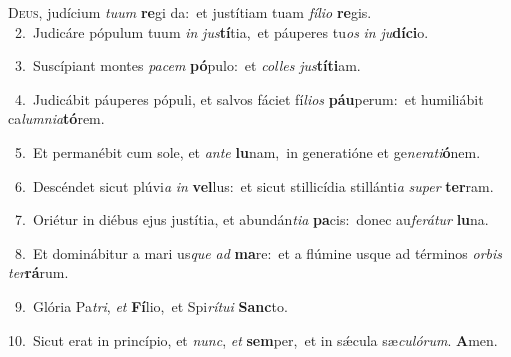 \lettrine{\initial\textcolor{\initialcolor}{D}}{eus,} judícium \textit{tu}\-\textit{um} \textbf{re}\-gi da:~\star et justítiam tuam \textit{fí}\-\textit{li}\textit{o} \textbf{re}\-gis.\\
{\numbfont\textcolor{\numbcolor}{~2.}}~Judicáre pópulum tuum \textit{in} \textit{jus}\-\textbf{tí}tia,~\star et páuperes tu\textit{os} \textit{in} \textit{ju}\-\textbf{dí}\textbf{ci}o.\par
{\numbfont\textcolor{\numbcolor}{~3.}}~Suscípiant montes \textit{pa}\-\textit{cem} \textbf{pó}\-pulo:~\star et \textit{col}\-\textit{les} \textit{jus}\-\textbf{tí}\textbf{ti}am.\par
{\numbfont\textcolor{\numbcolor}{~4.}}~Judicábit páuperes pópuli, et salvos fáciet fí\-\textit{li}\-\textit{os} \textbf{páu}\-perum:~\star et humiliábit ca\-\textit{lum}\-\textit{ni}\textit{a}\textbf{tó}rem.\par
{\numbfont\textcolor{\numbcolor}{~5.}}~Et permanébit cum sole, et \textit{an}\-\textit{te} \textbf{lu}\-nam,~\star in generatióne et ge\-\textit{ne}\-\textit{ra}\textit{ti}\textbf{ó}nem.\par
{\numbfont\textcolor{\numbcolor}{~6.}}~Descéndet sicut plúvi\textit{a} \textit{in} \textbf{vel}\-lus:~\star et sicut stillicídia stillánti\textit{a} \textit{su}\-\textit{per} \textbf{ter}\-ram.\par
{\numbfont\textcolor{\numbcolor}{~7.}}~Oriétur in diébus ejus justítia, et abundán\-\textit{ti}\-\textit{a} \textbf{pa}\-cis:~\star donec au\-\textit{fe}\-\textit{rá}\textit{tur} \textbf{lu}\-na.\par
{\numbfont\textcolor{\numbcolor}{~8.}}~Et dominábitur a mari us\textit{que} \textit{ad} \textbf{ma}\-re:~\star et a flúmine usque ad términos \textit{or}\-\textit{bis} \textit{ter}\-\textbf{rá}rum.\par
{\numbfont\textcolor{\numbcolor}{~9.}}~Glória Pa\-\textit{tri}\-, \textit{et} \textbf{Fí}\-lio,~\star et Spi\-\textit{rí}\-\textit{tu}\textit{i} \textbf{Sanc}\-to.\par
{\numbfont\textcolor{\numbcolor}{10.}}~Sicut erat in princípio, et \textit{nunc}\-, \textit{et} \textbf{sem}\-per,~\star et in sǽcula sæ\-\textit{cu}\-\textit{ló}\textit{rum}. \textbf{A}\-men.\par
